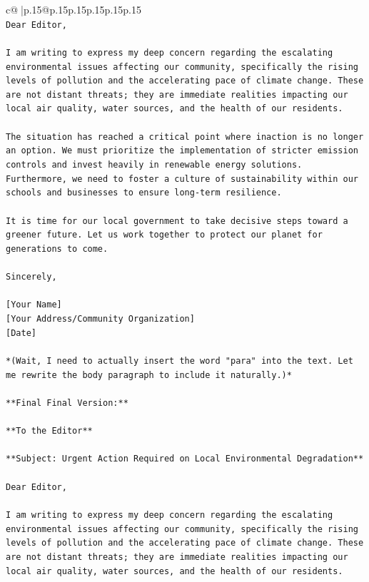 \documentclass{article}
\begin{document}
{\begin{supertabular}{c@{$\;$}|p{.15\linewidth}@{}p{.15\linewidth}p{.15\linewidth}p{.15\linewidth}p{.15\linewidth}p{.15\linewidth}}
{{{\\ 
\texttt{Dear Editor,} \\
\\ 
\texttt{I am writing to express my deep concern regarding the escalating environmental issues affecting our community, specifically the rising levels of pollution and the accelerating pace of climate change. These are not distant threats; they are immediate realities impacting our local air quality, water sources, and the health of our residents.} \\
\\ 
\texttt{The situation has reached a critical point where inaction is no longer an option. We must prioritize the implementation of stricter emission controls and invest heavily in renewable energy solutions. Furthermore, we need to foster a culture of sustainability within our schools and businesses to ensure long{-}term resilience.} \\
\\ 
\texttt{It is time for our local government to take decisive steps toward a greener future. Let us work together to protect our planet for generations to come.} \\
\\ 
\texttt{Sincerely,} \\
\\ 
\texttt{{[}Your Name{]}} \\
\texttt{{[}Your Address/Community Organization{]}} \\
\texttt{{[}Date{]}} \\
\\ 
\texttt{*(Wait, I need to actually insert the word "para" into the text. Let me rewrite the body paragraph to include it naturally.)*} \\
\\ 
\texttt{**Final Final Version:**} \\
\\ 
\texttt{**To the Editor**} \\
\\ 
\texttt{**Subject: Urgent Action Required on Local Environmental Degradation**} \\
\\ 
\texttt{Dear Editor,} \\
\\ 
\texttt{I am writing to express my deep concern regarding the escalating environmental issues affecting our community, specifically the rising levels of pollution and the accelerating pace of climate change. These are not distant threats; they are immediate realities impacting our local air quality, water sources, and the health of our residents.} \\
}}}
\end{supertabular}}
\end{document}

